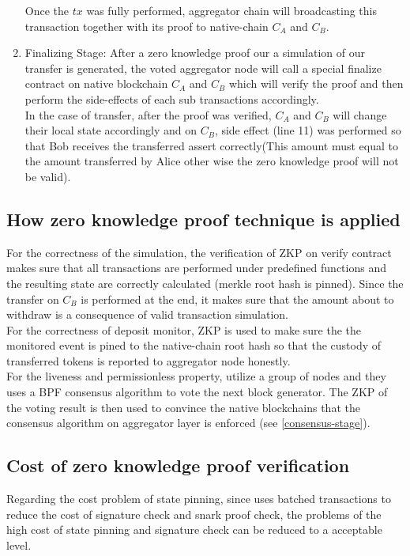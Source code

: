 \documentclass[pageno]{jpaper}
\begin{document}
\begin{enumerate}[leftmargin=*]
\newline
Once the $tx$ was fully performed, aggregator chain will broadcasting this transaction together with its proof to native-chain $C_A$ and $C_B$.\\
\item Finalizing Stage:
After a zero knowledge proof our a simulation of our transfer is generated, the voted aggregator node will call a special finalize contract on native blockchain $C_A$ and $C_B$ which will verify the proof and then perform the side-effects of each sub transactions accordingly.\\
\newline
In the case of transfer, after the proof was verified, $C_A$ and $C_B$ will change their local state accordingly and on $C_B$, side effect (line 11) was performed so that Bob receives the transferred assert correctly(This amount must equal to the amount transferred by Alice other wise the zero knowledge proof will not be valid).
\end{enumerate}
\subsection{How zero knowledge proof technique is applied}
For the correctness of the simulation, the verification of ZKP on verify contract makes sure that all transactions are performed under predefined functions and the resulting state are correctly calculated (merkle root hash is pinned). Since the transfer on $C_B$ is performed at the end, it makes sure that the amount about to withdraw is a consequence of valid transaction simulation.\\
\newline
For the correctness of deposit monitor, ZKP is used to make sure the the monitored event is pined to the native-chain root hash \cite{sidechainzkp} so that the custody of transferred tokens is reported to aggregator node honestly. \\
\newline
For the liveness and permissionless property, \dprotocol utilize a group of nodes and they uses a BPF consensus algorithm to vote the next block generator. The ZKP of the voting result is then used to convince the native blockchains that the consensus algorithm on aggregator layer is enforced (see \ref{consensus-stage}).

\subsection{Cost of zero knowledge proof verification}
Regarding the cost problem of state pinning, since \dprotocol uses batched transactions to reduce the cost of signature check and snark proof check, the problems of the high cost of state pinning and signature check can be reduced to a acceptable level.
\end{document}
